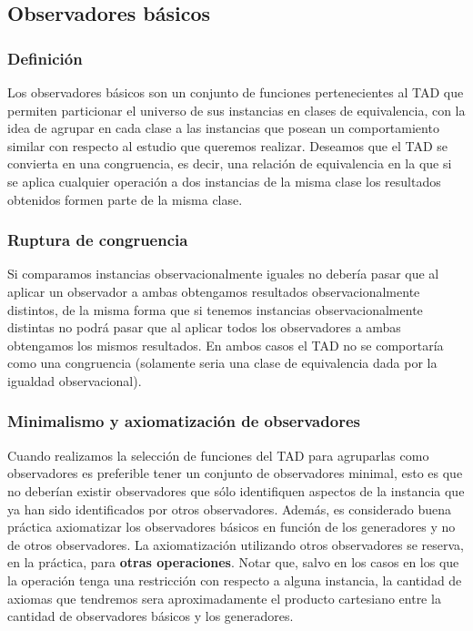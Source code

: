 \subsection{Observadores b\'asicos}

\subsubsection*{Definici\'on}
Los observadores b\'asicos son un conjunto de funciones pertenecientes al TAD que permiten particionar el universo de sus instancias en clases de equivalencia, con la idea de agrupar en cada clase a las instancias que posean un comportamiento similar con respecto al estudio que queremos realizar. Deseamos que el TAD se convierta en una congruencia, es decir, una relaci\'on de equivalencia en la que si se aplica cualquier operaci\'on a dos instancias de la misma clase los resultados obtenidos formen parte de la misma clase.

\subsubsection*{Ruptura de congruencia}
Si comparamos instancias observacionalmente iguales no deber\'ia pasar que al aplicar un observador a ambas obtengamos resultados observacionalmente distintos, de la misma forma que si tenemos instancias observacionalmente distintas no podr\'a pasar que al aplicar todos los observadores a ambas obtengamos los mismos resultados. En ambos casos el TAD no se comportar\'ia como una congruencia (solamente seria una clase de equivalencia dada por la igualdad observacional).

\subsubsection*{Minimalismo y axiomatizaci\'on de observadores}
Cuando realizamos la selecci\'on de funciones del TAD para agruparlas como observadores es preferible tener un conjunto de observadores minimal, esto es que no deber\'ian existir observadores que s\'olo identifiquen aspectos de la instancia que ya han sido identificados por otros observadores. Adem\'as, es considerado buena pr\'actica axiomatizar los observadores b\'asicos en funci\'on de los generadores y no de otros observadores. La axiomatizaci\'on utilizando otros observadores se reserva, en la pr\'actica, para \textbf{otras operaciones}. Notar que, salvo en los casos en los que la operaci\'on tenga una restricci\'on con respecto a alguna instancia, la cantidad de axiomas que tendremos sera aproximadamente el producto cartesiano entre la cantidad de observadores b\'asicos y los generadores.

